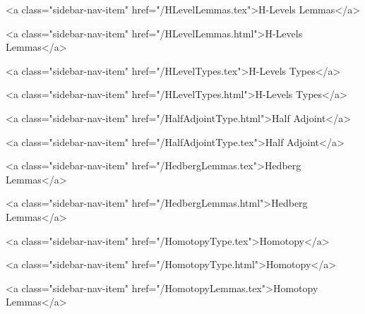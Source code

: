       
        
          <a class="sidebar-nav-item" href="/HLevelLemmas.tex">H-Levels Lemmas</a>
        
      
    
      
        
          <a class="sidebar-nav-item" href="/HLevelLemmas.html">H-Levels Lemmas</a>
        
      
    
      
        
          <a class="sidebar-nav-item" href="/HLevelTypes.tex">H-Levels Types</a>
        
      
    
      
        
          <a class="sidebar-nav-item" href="/HLevelTypes.html">H-Levels Types</a>
        
      
    
      
        
          <a class="sidebar-nav-item" href="/HalfAdjointType.html">Half Adjoint</a>
        
      
    
      
        
          <a class="sidebar-nav-item" href="/HalfAdjointType.tex">Half Adjoint</a>
        
      
    
      
        
          <a class="sidebar-nav-item" href="/HedbergLemmas.tex">Hedberg Lemmas</a>
        
      
    
      
        
          <a class="sidebar-nav-item" href="/HedbergLemmas.html">Hedberg Lemmas</a>
        
      
    
      
        
          <a class="sidebar-nav-item" href="/HomotopyType.tex">Homotopy</a>
        
      
    
      
        
          <a class="sidebar-nav-item" href="/HomotopyType.html">Homotopy</a>
        
      
    
      
        
          <a class="sidebar-nav-item" href="/HomotopyLemmas.tex">Homotopy Lemmas</a>
        
      
    
